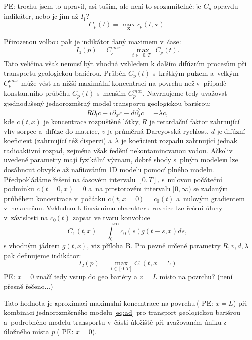 \documentclass{article}
\def\vc#1{\mathbf{\boldsymbol{#1}}}     %
\newcommand{\pe}[1]{{\color{orange} PE: #1}}
\begin{document}
\pe{trochu jsem to upravil, asi tuším, ale není to srozumitelné: je $C_p$ opravdu indikátor, nebo je jím až $I_1$?}
\[
  C_p(t) = \max_{\vc x} c_p(t, \vc x).
\]

Přirozenou volbou pak je indikátor daný maximem v~čase:
\begin{equation}
    I_1(p) = C_p^{max} = \max_{t\in[0, T]} C_p(t).
\end{equation}
Tato veličina však nemusí být vhodná vzhledem k dalším difúzním procesům při transportu geologickou bariérou.
Průběh $C_p(t)$ s~krátkým pulzem a~velkým $C_p^{max}$ může vést na nižší maximální koncentraci na povrchu než v~případě konstantního průběhu $C_p(t)$ s~menším  $C_p^{max}$. Navrhujeme tedy uvažovat zjednodušený jednorozměrný model transportu geologickou bariérou:
\begin{equation}
    \label{eq:ad}
    R\partial_t c + v \partial_x c - d \partial^2_x c = - \lambda c,
\end{equation}
kde $c(t,x)$ je koncentrace rozpuštěné látky, $R$ je retardační faktor zahrnující vliv sorpce a~difúze do matrice, $v$ je průměrná Darcyovská rychlost, $d$ je difúzní koeficient (zahrnující též disperzi) a~$\lambda$ je koeficient rozpadu zahrnující jednak radioaktivní rozpad, zejména však ředění nekontaminovanou vodou. Ačkoliv uvedené parametry mají fyzikální význam, dobré shody s~plným modelem lze dosáhnout obvykle až nafitováním 1D modelu pomocí plného modelu.
Předpokládáme řešení na časovém intervalu  $[0, T]$, s~nulovou počáteční podmínku $c(t=0, x) = 0$ a~na prostorovém intervalu $[0, \infty)$ se zadaným 
průběhem koncentrace v~počátku $c(t, x=0) = c_0(t)$ a~nulovým gradientem v~nekonečnu.
Vzhledem k lineárnímu charakteru rovnice lze řešení úlohy v~závislosti na $c_0(t)$ zapsat ve tvaru konvoluce
\begin{equation}
    C_1(t, x) = \int_{0}^\infty c_0(s) g(t - s, x) ds,
\end{equation}
s  vhodným jádrem $g(t, x)$, viz příloha B. Pro pevně určené parametry $R, v, d, \lambda$ pak definujeme indikátor:
\begin{equation}
    I_2(p) =  \max_{t\in[0, T]} C_1(t, x=L)
\end{equation}
\pe{$x=0$ značí tedy vstup do geo bariéry a $x=L$  místo na povrchu? (není přesně řečeno...)}

Tato hodnota je aproximací maximální koncentrace na povrchu (\pe{$x=L$})
při kombinaci jednorozměrného modelu \eqref{eq:ad} pro transport geologickou bariérou a~podrobného modelu transportu v~části úložiště při uvažovaném úniku z úložného místa $p$ (\pe{$x=0$}). 
\end{document}

